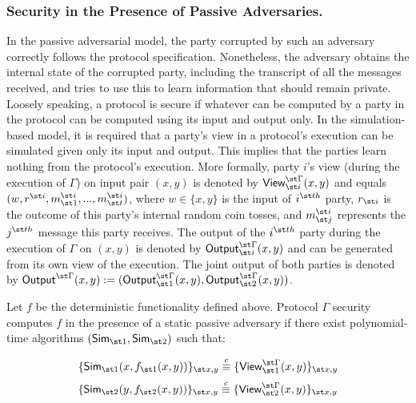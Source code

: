  \subsubsection{Security in the Presence of Passive Adversaries.}  In the passive adversarial model, the party corrupted by such an adversary correctly follows the protocol specification. Nonetheless, the adversary obtains the internal state of the corrupted party, including the transcript of all the messages received, and tries to use this to learn information that should remain private. Loosely speaking, a protocol is secure if whatever can be computed by a party in the protocol can be computed using its input and output only. In the simulation-based model, it is required that a party’s view in a protocol's 
 execution can be simulated given only its input and output. This implies that the parties learn nothing from the protocol's execution. More formally, party $i$’s view (during the execution of $\Gamma$) on input pair  $(x, y)$ is denoted by $\mathsf{View}_{\st i}^{\st \Gamma}(x,y)$ and equals $(w, r^{\st i}, m_{\st 1}^{\st i}, ..., m_{\st t}^{\st i})$, where $w\in\{x,y\}$ is the input of $i^{\st th}$ party, $r_{\st i}$ is the outcome of this party's internal random coin tosses, and $m_{\st j}^{\st i}$ represents the $j^{\st th}$ message this party receives.  The output of the $i^{\st th}$ party during the execution of $\Gamma$ on $(x, y)$ is denoted by $\mathsf{Output}_{\st i}^{\st \Gamma}(x,y)$ and can be generated from its own view of the execution.  The joint output of both parties is denoted by $\mathsf{Output}^{\st \Gamma}(x,y):=(\mathsf{Output}_{\st 1}^{\st \Gamma}(x,y), \mathsf{Output}_{\st 2}^{\st \Gamma}(x,y))$.

\begin{definition}
Let $f$ be the deterministic functionality defined above. Protocol $\Gamma$ security computes $f$ in the presence of a static  passive adversary if there exist polynomial-time algorithms $(\mathsf {Sim}_{\st 1}, \mathsf {Sim}_{\st 2})$ such that:
\end{definition}

  \begin{equation*}
  \{\mathsf {Sim}_{\st 1}(x,f_{\st 1}(x,y))\}_{\st x,y}\stackrel{c}{\equiv} \{\mathsf{View}_{\st 1}^{\st \Gamma}(x,y) \}_{\st x,y}\\
  \end{equation*}
  \begin{equation*}
    \{\mathsf{Sim}_{\st 2}(y, f_{\st 2}(x,y))\}_{\st x,y}\stackrel{c}{\equiv} \{\mathsf{View}_{\st 2}^{\st \Gamma}(x,y) \}_{\st x,y}
  \end{equation*}
  
